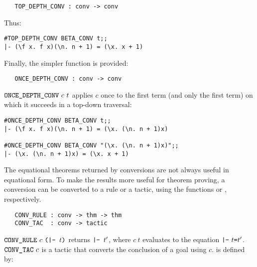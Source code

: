 \begin{holboxed}
\begin{verbatim}
   TOP_DEPTH_CONV : conv -> conv
\end{verbatim}\end{holboxed}

\noindent Thus:

\begin{session}\begin{verbatim}
#TOP_DEPTH_CONV BETA_CONV t;;
|- (\f x. f x)(\n. n + 1) = (\x. x + 1)
\end{verbatim}\end{session}

Finally, the simpler function  is provided:

\begin{holboxed}
\begin{verbatim}
   ONCE_DEPTH_CONV : conv -> conv
\end{verbatim}\end{holboxed}

\noindent $\ml{ONCE\_DEPTH\_CONV}\ c\ t$ applies $c$ once to the first
term (and only the first term)
on which it succeeds in a top-down traversal:

\begin{session}\begin{verbatim}
#ONCE_DEPTH_CONV BETA_CONV t;;
|- (\f x. f x)(\n. n + 1) = (\x. (\n. n + 1)x)

#ONCE_DEPTH_CONV BETA_CONV "(\x. (\n. n + 1)x)";;
|- (\x. (\n. n + 1)x) = (\x. x + 1)
\end{verbatim}\end{session}

The equational theorems returned by conversions are not always
useful in equational form.  To make the results more useful for theorem
proving,
a conversion can be converted to a rule or a tactic, using the functions
 or , respectively.


\begin{holboxed}
\begin{verbatim}
   CONV_RULE : conv -> thm -> thm
   CONV_TAC  : conv -> tactic
\end{verbatim}\end{holboxed}

\noindent $\ml{CONV\_RULE}\ c\ \ml{(|- }t\ml{)}$ returns $\ml{|- }t'$, where
$c\ t$ evaluates to the equation
$\ml{|-}\ t\ml{=}t'$.
$\ml{CONV\_TAC}\ c$ is a tactic that
converts the conclusion of a goal using $c$.  is defined by:

